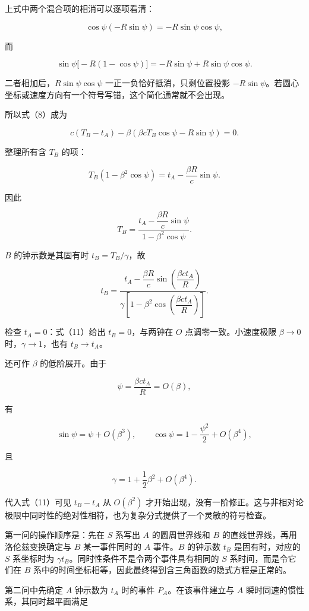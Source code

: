\documentclass[12pt,a4paper,UTF8]{ctexart}
\begin{document}
上式中两个混合项的相消可以逐项看清：

\[\cos\psi(-R\sin\psi)=-R\sin\psi\cos\psi,\]

而

\[\sin\psi\bigl[-R(1-\cos\psi)\bigr]
=-R\sin\psi+R\sin\psi\cos\psi.\]

二者相加后，\(R\sin\psi\cos\psi\) 一正一负恰好抵消，只剩位置投影
\(-R\sin\psi\)。若圆心坐标或速度方向有一个符号写错，这个简化通常就不会出现。

所以式（8）成为

\[c(T_B-t_A)-\beta
(\beta cT_B\cos\psi-R\sin\psi)=0.\]

整理所有含 \(T_B\) 的项：

\[T_B(1-\beta^2\cos\psi)
=t_A-\frac{\beta R}{c}\sin\psi. \tag{9}\]

因此

\[T_B=\frac{t_A-\dfrac{\beta R}{c}\sin\psi}
{1-\beta^2\cos\psi}. \tag{10}\]

\(B\) 的钟示数是其固有时 \(t_B=T_B/\gamma\)，故

\[\boxed{
t_B=\frac{
t_A-\dfrac{\beta R}{c}\sin\left(\dfrac{\beta ct_A}{R}\right)}
{\gamma\left[1-\beta^2\cos\left(\dfrac{\beta ct_A}{R}\right)\right]}
}. \tag{11}\]

检查 \(t_A=0\)：式（11）给出 \(t_B=0\)，与两钟在 \(O\)
点调零一致。小速度极限 \(\beta\to0\) 时，\(\gamma\to1\)，也有
\(t_B\to t_A\)。

还可作 \(\beta\) 的低阶展开。由于

\[\psi=\frac{\beta ct_A}{R}=O(\beta),\]

有

\[\sin\psi=\psi+O(\beta^3),\qquad
\cos\psi=1-\frac{\psi^2}{2}+O(\beta^4),\]

且

\[\gamma=1+\frac12\beta^2+O(\beta^4).\]

代入式（11）可见 \(t_B-t_A\) 从 \(O(\beta^2)\)
才开始出现，没有一阶修正。这与非相对论极限中同时性的绝对性相符，也为复杂分式提供了一个灵敏的符号检查。

第一问的操作顺序是：先在 \(S\) 系写出 \(A\) 的圆周世界线和 \(B\)
的直线世界线，再用洛伦兹变换确定与 \(B\) 某一事件同时的 \(A\)
事件。\(B\) 的钟示数 \(t_B\) 是固有时，对应的 \(S\) 系坐标时为
\(\gamma t_B\)。同时性条件不是令两个事件具有相同的 \(S\)
系时间，而是令它们在 \(B\)
系中的时间坐标相等，因此最终得到含三角函数的隐式方程是正常的。

第二问中先确定 \(A\) 钟示数为 \(t_A\) 时的事件 \(P_A\)。在该事件建立与
\(A\) 瞬时同速的惯性系，其同时超平面满足
\end{document}

